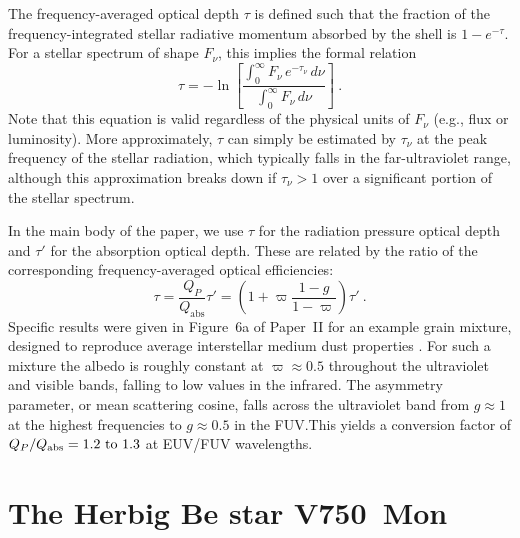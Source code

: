 \documentclass[useAMS, usenatbib, a4paper]{mnras}
\begin{document}
The frequency-averaged optical depth \(\tau\) is defined such that the
fraction of the frequency-integrated stellar radiative momentum
absorbed by the shell is \(1 - e^{-\tau}\).  For a stellar spectrum of
shape \(F_\nu\), this implies the formal relation
\begin{equation}
  \label{eq:tau-averaged}
  \tau = - \ln \left[ \frac{\int_0^\infty F_\nu \, e^{-\tau_\nu} \, d\nu}{\int_0^\infty F_\nu  \, d\nu} \right] \ .
\end{equation}
Note that this equation is valid regardless of the physical units of
\(F_\nu\) (e.g., flux or luminosity).  More approximately, \(\tau\) can
simply be estimated by \(\tau_\nu\) at the peak frequency of the stellar
radiation, which typically falls in the far-ultraviolet range,
although this approximation breaks down if \(\tau_\nu > 1\) over a
significant portion of the stellar spectrum.

In the main body of the paper, we use \(\tau\) for the radiation pressure
optical depth and \(\tau'\) for the absorption optical depth.  These are
related by the ratio of the corresponding frequency-averaged optical
efficiencies:
\begin{equation}
  \label{eq:tau_tauprime}
  \tau = \frac{Q_P}{Q_{\text{abs}}} \tau' = \left(  1 + \varpi \frac{1 - g}{1 - \varpi}\right) \tau'\ .
\end{equation}
Specific results were given in Figure~6a of Paper~II for an example
grain mixture, designed to reproduce average interstellar medium dust
properties \citep{Weingartner:2001b, Abel:2008a, Ferland:2013a,
  Ferland:2017a}.  For such a mixture the albedo is roughly constant
at \(\varpi \approx 0.5\) throughout the ultraviolet and visible bands,
falling to low values in the infrared.  The asymmetry parameter, or
mean scattering cosine, falls across the ultraviolet band from
\(g \approx 1\) at the highest frequencies to \(g\approx 0.5\) in the FUV.\@ This
yields a conversion factor of
\(Q_P / Q_{\text{abs}} = \text{\numrange{1.2}{1.3}}\) at EUV/FUV
wavelengths.  




\section{The Herbig Be star V750~Mon}
\label{sec:notes-part-sourc}
\label{sec:hd-53367-v750}
  
\end{document}

